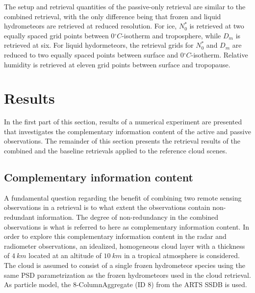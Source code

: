 \documentclass[journal abbreviation, manuscript]{copernicus}
\begin{document}
The setup and retrieval quantities of the passive-only retrieval are similar to
the combined retrieval, with the only difference being that frozen and liquid
hydrometeors are retrieved at reduced resolution. For ice, $N_0^*$ is retrieved
at two equally spaced grid points between $0\unit{^\circ C}$-isotherm and
troposphere, while $D_m$ is retrieved at six. For liquid hydormeteors, the
retrieval grids for $N_0^*$ and $D_m$ are reduced to two equally spaced points
between surface and $0\unit{^\circ C}$-isotherm. Relative humidity is retrieved
at eleven grid points between surface and tropopause.

\section{Results}
\label{sec:results}

In the first part of this section, results of a numerical experiment are
presented that investigates the complementary information content of the active
and passive observations. The remainder of this section presents the retrieval
results of the combined and the baseline retrievals applied to the reference
cloud scenes.

\subsection{Complementary information content}
\label{sec:orgdc1b0b8}

A fundamental question regarding the benefit of combining two remote sensing
observations in a retrieval is to what extent the observations contain
non-redundant information. The degree of non-redundancy in the combined
observations is what is referred to here as complementary information content.
In order to explore this complementary information content in the radar and
radiometer observations, an idealized, homogeneous cloud layer with a thickness of
$4\ \unit{km}$ located at an altitude of $10\ \unit{km}$ in a tropical atmosphere is
considered. The cloud is assumed to consist of a single frozen hydrometeor
species using the same PSD parametrization as the frozen hydrometeors used in
the cloud retrieval. As particle model, the 8-ColumnAggregate (ID 8) from the ARTS
SSDB is used.
\end{document}

